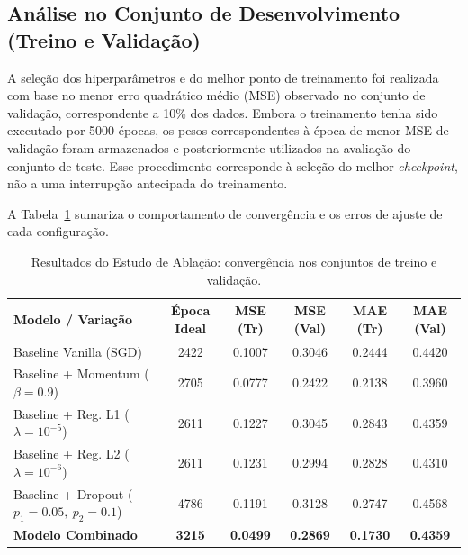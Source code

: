 \documentclass[11pt,a4paper]{article}
\begin{document}
\subsection{Análise no Conjunto de Desenvolvimento (Treino e Validação)}

A seleção dos hiperparâmetros e do melhor ponto de treinamento foi realizada com base no menor erro quadrático médio (MSE) observado no conjunto de validação, correspondente a 10\% dos dados. Embora o treinamento tenha sido executado por 5000 épocas, os pesos correspondentes à época de menor MSE de validação foram armazenados e posteriormente utilizados na avaliação do conjunto de teste. Esse procedimento corresponde à seleção do melhor \textit{checkpoint}, não a uma interrupção antecipada do treinamento.

A Tabela~\ref{tab:ablation_train_val} sumariza o comportamento de convergência e os erros de ajuste de cada configuração.

\begin{table}[H]
\centering
\small
\caption{Resultados do Estudo de Ablação: convergência nos conjuntos de treino e validação.}
\label{tab:ablation_train_val}

\begin{tabularx}{\textwidth}{
    >{\raggedright\arraybackslash}X
    c
    c
    c
    c
    c
}

\toprule

\textbf{Modelo / Variação}
&
\textbf{Época Ideal}
&
\textbf{MSE (Tr)}
&
\textbf{MSE (Val)}
&
\textbf{MAE (Tr)}
&
\textbf{MAE (Val)}
\\

\midrule

Baseline Vanilla (SGD)
& 2422
& 0.1007
& 0.3046
& 0.2444
& 0.4420
\\

\addlinespace

Baseline + Momentum ($\beta = 0.9$)
& 2705
& 0.0777
& 0.2422
& 0.2138
& 0.3960
\\

\addlinespace

Baseline + Reg. L1 ($\lambda = 10^{-5}$)
& 2611
& 0.1227
& 0.3045
& 0.2843
& 0.4359
\\

\addlinespace

Baseline + Reg. L2 ($\lambda = 10^{-6}$)
& 2611
& 0.1231
& 0.2994
& 0.2828
& 0.4310
\\

\addlinespace

Baseline + Dropout ($p_1 = 0.05,\ p_2 = 0.1$)
& 4786
& 0.1191
& 0.3128
& 0.2747
& 0.4568
\\

\addlinespace

\textbf{Modelo Combinado}
& \textbf{3215}
& \textbf{0.0499}
& \textbf{0.2869}
& \textbf{0.1730}
& \textbf{0.4359}
\\

\bottomrule

\end{tabularx}
\end{table}
\end{document}
